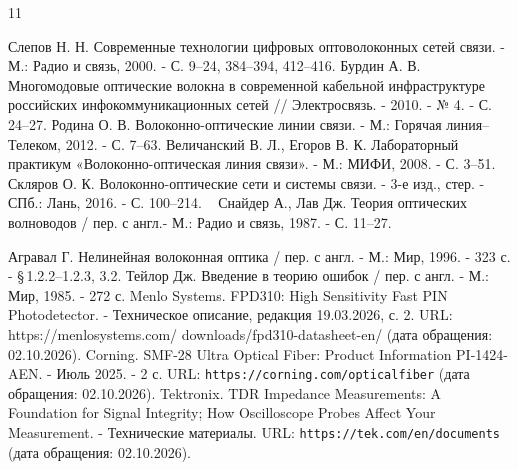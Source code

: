 \documentclass[14pt,a4paper]{extarticle}
\numberwithin{equation}{section}
\numberwithin{figure}{section}
\numberwithin{table}{section}
\begin{document}
\newpage
{}
{}
\begin{thebibliography}{11}
\raggedright
Слепов Н. Н. Современные технологии цифровых оптоволоконных сетей
связи. - М.: Радио и связь, 2000. - С. 9--24, 384--394, 412--416.
Бурдин А. В. Многомодовые оптические волокна в современной кабельной
инфраструктуре российских инфокоммуникационных сетей // Электросвязь. - 2010. - № 4. - С. 24--27.
Родина О. В. Волоконно-оптические линии связи. - М.: Горячая линия--Телеком, 2012. - С. 7--63.
Величанский В. Л., Егоров В. К. Лабораторный практикум
«Волоконно-оптическая линия связи». - М.: МИФИ, 2008. - С. 3--51.
Скляров О. К. Волоконно-оптические сети и системы связи.
- 3-е изд., стер. - СПб.: Лань, 2016. - С. 100--214.
\
Снайдер А., Лав Дж. Теория оптических волноводов / пер. с англ.- М.: Радио и связь, 1987. - С. 11--27.

Агравал Г. Нелинейная волоконная оптика / пер. с англ. - М.: Мир, 1996. - 323 с. - \S\,1.2.2--1.2.3, 3.2.
\bibitem[8]{taylor}
Тейлор Дж. Введение в теорию ошибок / пер. с англ.
- М.: Мир, 1985. - 272 с.
Menlo Systems. FPD310: High Sensitivity Fast PIN Photodetector.
- Техническое описание, редакция 19.03.2026, с. 2.
URL: {\small\ttfamily https://menlosystems.com/\allowbreak
downloads/\allowbreak fpd310-datasheet-en/}
(дата обращения: 02.10.2026).
Corning. SMF-28 Ultra Optical Fiber: Product Information
PI-1424-AEN. - Июль 2025. - 2 с.
URL: \texttt{https://corning.com/opticalfiber}
(дата обращения: 02.10.2026).
Tektronix. TDR Impedance Measurements: A Foundation for Signal
Integrity; How Oscilloscope Probes Affect Your Measurement.
- Технические материалы.
URL: \texttt{https://tek.com/en/documents}
(дата обращения: 02.10.2026).
\end{thebibliography}
\end{document}

